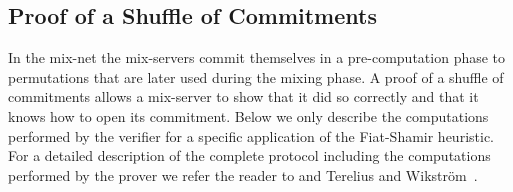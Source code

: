 \documentclass[11pt]{article}
\begin{document}
\subsection{Proof of a Shuffle of Commitments}\label{sect:pos}

In the \veri mix-net the mix-servers commit themselves in a
pre-computation phase to permutations that are later used during the
mixing phase. A proof of a shuffle of commitments allows a mix-server
to show that it did so correctly and that it knows how to open its
commitment. Below we only describe the computations performed by the
verifier for a specific application of the Fiat-Shamir heuristic. For
a detailed description of the complete protocol including the
computations performed by the prover we refer the reader to
 and Terelius and Wikstr{\"o}m~\cite{TW10}.
\end{document}
